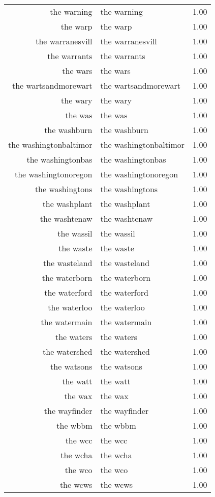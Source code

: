 \begin{table}[ht]
\begin{tabular}{rlr}
  the warning & the warning & 1.00 \\ 
  the warp & the warp & 1.00 \\ 
  the warranesvill & the warranesvill & 1.00 \\ 
  the warrants & the warrants & 1.00 \\ 
  the wars & the wars & 1.00 \\ 
  the wartsandmorewart & the wartsandmorewart & 1.00 \\ 
  the wary & the wary & 1.00 \\ 
  the was & the was & 1.00 \\ 
  the washburn & the washburn & 1.00 \\ 
  the washingtonbaltimor & the washingtonbaltimor & 1.00 \\ 
  the washingtonbas & the washingtonbas & 1.00 \\ 
  the washingtonoregon & the washingtonoregon & 1.00 \\ 
  the washingtons & the washingtons & 1.00 \\ 
  the washplant & the washplant & 1.00 \\ 
  the washtenaw & the washtenaw & 1.00 \\ 
  the wassil & the wassil & 1.00 \\ 
  the waste & the waste & 1.00 \\ 
  the wasteland & the wasteland & 1.00 \\ 
  the waterborn & the waterborn & 1.00 \\ 
  the waterford & the waterford & 1.00 \\ 
  the waterloo & the waterloo & 1.00 \\ 
  the watermain & the watermain & 1.00 \\ 
  the waters & the waters & 1.00 \\ 
  the watershed & the watershed & 1.00 \\ 
  the watsons & the watsons & 1.00 \\ 
  the watt & the watt & 1.00 \\ 
  the wax & the wax & 1.00 \\ 
  the wayfinder & the wayfinder & 1.00 \\ 
  the wbbm & the wbbm & 1.00 \\ 
  the wcc & the wcc & 1.00 \\ 
  the wcha & the wcha & 1.00 \\ 
  the wco & the wco & 1.00 \\ 
  the wcws & the wcws & 1.00 \\ 

\end{tabular}
\end{table}
